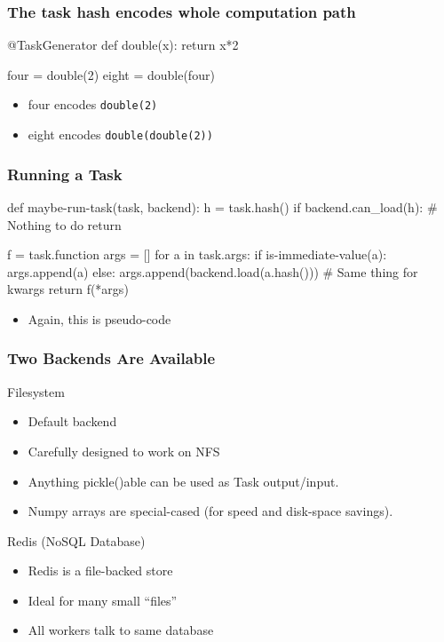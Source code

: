 \documentclass{beamer}
\begin{document}
\begin{frame}[fragile]
\frametitle{The task hash encodes whole computation path}

\begin{python}
@TaskGenerator
def double(x):
    return x*2

four = double(2)
eight = double(four)
\end{python}

\begin{itemize}
\item \alert{four} encodes \verb+double(2)+
\item \alert{eight} encodes \verb+double(double(2))+
\end{itemize}

\end{frame}

\begin{frame}[fragile]
\frametitle{Running a Task}

\begin{python}
def maybe-run-task(task, backend):
    h = task.hash()
    if backend.can_load(h):
        # Nothing to do
        return
\end{python}
\pause
\begin{python}
    f = task.function
    args = []
    for a in task.args:
        if is-immediate-value(a):
            args.append(a)
        else:
            args.append(backend.load(a.hash()))
    # Same thing for kwargs
    return f(*args)

\end{python}

\begin{itemize}
\item Again, this is \alert{pseudo-code}
\end{itemize}

\end{frame}

\begin{frame}[fragile]
\frametitle{Two Backends Are Available}
\begin{block}{Filesystem}
\begin{itemize}
\item Default backend
\item Carefully designed to work on NFS
\item Anything pickle()able can be used as Task output/input.
\item Numpy arrays are special-cased (for speed and disk-space savings).
\end{itemize}
\end{block}

\begin{block}{Redis (NoSQL Database)}
\begin{itemize}
\item Redis is a file-backed store
\item Ideal for many small ``files''
\item All workers talk to same database
\end{itemize}
\end{block}

\end{frame}
\end{document}

